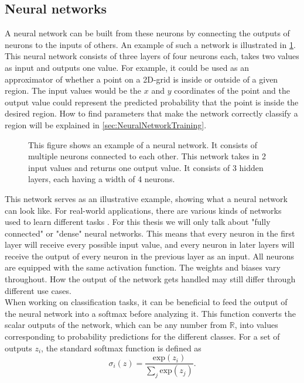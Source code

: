 \subsection{Neural networks}\label{sec:NeuralNetworks}
A neural network can be built from these neurons by connecting the outputs of neurons to the inputs of others. An example of such a network is illustrated in \cref{fig:Neural_network_example}. This neural network consists of three layers of four neurons each, takes two values as input and outputs one value. For example, it could be used as an approximator of whether a point on a 2D-grid is inside or outside of a given region. The input values would be the $x$ and $y$ coordinates of the point and the output value could represent the predicted probability that the point is inside the desired region. How to find parameters that make the network correctly classify a region will be explained in \cref{sec:NeuralNetworkTraining}.\\
\begin{figure}
	\centering
	
	\caption{This figure shows an example of a neural network. It consists of multiple neurons connected to each other. This network takes in 2 input values and returns one output value. It consists of 3 hidden layers, each having a width of 4 neurons.}
	\label{fig:Neural_network_example}
\end{figure}
This network serves as an illustrative example, showing what a neural network can look like. For real-world applications, there are various kinds of networks used to learn different tasks \cite{DeepLearningTaxonomy}. For this thesis we will only talk about "fully connected" or "dense" neural networks. This means that every neuron in the first layer will receive every possible input value, and every neuron in later layers will receive the output of every neuron in the previous layer as an input. All neurons are equipped with the same activation function. The weights and biases vary throughout. How the output of the network gets handled may still differ through different use cases. \\
When working on classification tasks, it can be beneficial to feed the output of the neural network into a softmax before analyzing it. This function converts the scalar outputs of the network, which can be any number from $\mathbb{R}$, into values corresponding to probability predictions for the different classes. For a set of outputs $z_i$, the standard softmax function is defined as 
\begin{equation}\label{eq:softmax}
	\sigma_i(z) = \frac{\mathrm{exp}(z_i)}{\sum_j \mathrm{exp}(z_j)}.
\end{equation}
